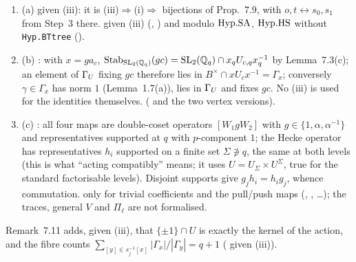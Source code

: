 \begin{outline}
\begin{enumerate}
\item (a) \stproved{} given (iii): it is (iii)$\Rightarrow$(i)$\Rightarrow$ bijections of Prop.~7.9, with $o,t\leftrightarrow s_0,s_1$ from
Step~3 there. \stformal{} given (iii) (, ) and modulo
$\mathrm{Hyp.SA}$, $\mathrm{Hyp.HS}$ without \texttt{Hyp.BTtree} ().
\item (b) \stproved: with $x=ga_c$, $\operatorname{Stab}_{\mathrm{SL}_2(\mathbb{Q}_q)}(gc)=\mathrm{SL}_2(\mathbb{Q}_q)\cap x_qU_{c,q}x_q^{-1}$ by Lemma~7.3(c); an element of $\Gamma_U$
fixing $gc$ therefore lies in $B^\times\cap xU_cx^{-1}=\Gamma_x$; conversely $\gamma\in\Gamma_x$ has norm $1$ (Lemma~1.7(a)), lies in $\Gamma_U$
and fixes $gc$. No (iii) is used for the identities themselves. \stformal{} ( and the
two vertex versions).
\item (c) \stproved: all four maps are double-coset operators $[W_1gW_2]$ with $g\in\{1,\alpha,\alpha^{-1}\}$ and representatives
supported at $q$ with $p$-component $1$; the Hecke operator has representatives $h_i$ supported on a finite set $\Sigma\not\ni q$,
the same at both levels (this is what ``acting compatibly'' means; it uses $U=U_\Sigma\times U^\Sigma$, true for the standard
factorisable levels). Disjoint supports give $g_jh_i=h_ig_j$, whence commutation. \stformal{} only for trivial coefficients and the
pull/push maps (, , \dots); the
traces, general $V$ and $\Pi_\ell$ are not formalised.
\end{enumerate}
Remark~7.11 adds, given (iii), that $\{\pm1\}\cap U$ is exactly the kernel of the action, and the fibre counts
$\sum_{[y]\in s_j^{-1}[x]}|\Gamma_x|/|\Gamma_y|=q+1$ (\stproved{} given (iii)).
\end{outline}

